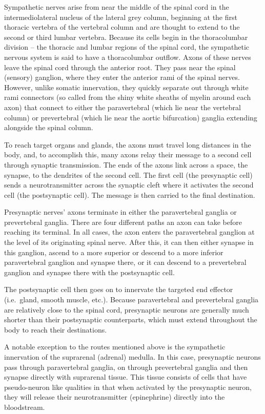 Sympathetic nerves arise from near the middle of the spinal cord in the intermediolateral nucleus of the lateral grey column, beginning at the first thoracic vertebra of the vertebral column and are thought to extend to the second or third lumbar vertebra. Because its cells begin in the thoracolumbar division -- the thoracic and lumbar regions of the spinal cord, the sympathetic nervous system is said to have a thoracolumbar outflow. Axons of these nerves leave the spinal cord through the anterior root. They pass near the spinal (sensory) ganglion, where they enter the anterior rami of the spinal nerves. However, unlike somatic innervation, they quickly separate out through white rami connectors (so called from the shiny white sheaths of myelin around each axon) that connect to either the paravertebral (which lie near the vertebral column) or prevertebral (which lie near the aortic bifurcation) ganglia extending alongside the spinal column.

To reach target organs and glands, the axons must travel long distances in the body, and, to accomplish this, many axons relay their message to a second cell through synaptic transmission. The ends of the axons link across a space, the synapse, to the dendrites of the second cell. The first cell (the presynaptic cell) sends a neurotransmitter across the synaptic cleft where it activates the second cell (the postsynaptic cell). The message is then carried to the final destination.

Presynaptic nerves' axons terminate in either the paravertebral ganglia or prevertebral ganglia. There are four different paths an axon can take before reaching its terminal. In all cases, the axon enters the paravertebral ganglion at the level of its originating spinal nerve. After this, it can then either synapse in this ganglion, ascend to a more superior or descend to a more inferior paravertebral ganglion and synapse there, or it can descend to a prevertebral ganglion and synapse there with the postsynaptic cell.

The postsynaptic cell then goes on to innervate the targeted end effector (i.e.~gland, smooth muscle, etc.). Because paravertebral and prevertebral ganglia are relatively close to the spinal cord, presynaptic neurons are generally much shorter than their postsynaptic counterparts, which must extend throughout the body to reach their destinations.

A notable exception to the routes mentioned above is the sympathetic innervation of the suprarenal (adrenal) medulla. In this case, presynaptic neurons pass through paravertebral ganglia, on through prevertebral ganglia and then synapse directly with suprarenal tissue. This tissue consists of cells that have pseudo-neuron like qualities in that when activated by the presynaptic neuron, they will release their neurotransmitter (epinephrine) directly into the bloodstream.

